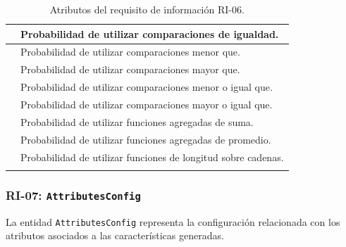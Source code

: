 \begin{longtable}{@{}P{5.3cm} P{\dimexpr\textwidth-5.3cm-2\tabcolsep\relax}@{}}
\midrule
{} & Probabilidad de utilizar comparaciones de igualdad. \\

\midrule
{} & Probabilidad de utilizar comparaciones menor que. \\

\midrule
{} & Probabilidad de utilizar comparaciones mayor que. \\

\midrule
{} & Probabilidad de utilizar comparaciones menor o igual que. \\

\midrule
{} & Probabilidad de utilizar comparaciones mayor o igual que. \\

\midrule
{} & Probabilidad de utilizar funciones agregadas de suma. \\

\midrule
{} & Probabilidad de utilizar funciones agregadas de promedio. \\

\midrule
{} & Probabilidad de utilizar funciones de longitud sobre cadenas. \\

\bottomrule
\caption{Atributos del requisito de información RI-06.}
\label{tab:ri-constraints-config}
\end{longtable}


\subsubsection*{RI-07: \texttt{AttributesConfig}}

La entidad \texttt{AttributesConfig} representa la configuración relacionada con los atributos asociados a las características generadas.

